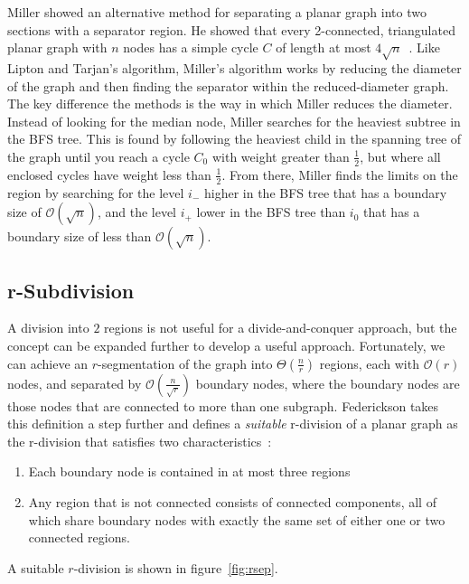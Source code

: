 \documentclass[11pt]{article}
\begin{document}
Miller showed an alternative method for separating a planar graph into two sections with a separator region. He showed that every 2-connected, triangulated planar graph with $n$ nodes has a simple cycle $C$ of length at most $4\sqrt{n}$~\cite{miller1984finding}. Like Lipton and Tarjan's algorithm, Miller's algorithm works by reducing the diameter of the graph and then finding the separator within the reduced-diameter graph. The key difference the methods is the way in which Miller reduces the diameter. Instead of looking for the median node, Miller searches for the heaviest subtree in the BFS tree. This is found by following the heaviest child in the spanning tree of the graph until you reach a cycle $C_0$ with weight greater than $\frac{1}{2}$, but where all enclosed cycles have weight less than $\frac{1}{2}$. From there, Miller finds the limits on the region by searching for the level $i_-$ higher in the BFS tree that has a boundary size of $\mathcal{O}(\sqrt{n})$, and the level $i_+$ lower in the BFS tree than $i_0$ that has  a boundary size of less than $\mathcal{O}(\sqrt{n})$.

\subsection{r-Subdivision}
\label{sec:graph-sep-rsub}

A division into $2$ regions is not useful for a divide-and-conquer approach, but the concept can be expanded further to develop a useful approach. Fortunately, we can achieve an $r$-segmentation of the graph into $\Theta \left (\frac{n}{r} \right )$ regions, each with $\mathcal{O}(r)$ nodes, and separated by $\mathcal{O} \left (\frac{n}{\sqrt{r}} \right )$ boundary nodes, where the boundary nodes are those nodes that are connected to more than one subgraph. Federickson takes this definition a step further and defines a \textit{suitable} r-division of a planar graph as the r-division that satisfies two characteristics~\cite{federickson1987fast}:
\begin{enumerate}
    \item Each boundary node is contained in at most three regions

    \item Any region that is not connected consists of connected components, all of which share boundary nodes with exactly the same set of either one or two connected regions.
\end{enumerate}
A suitable $r$-division is shown in figure~\ref{fig:rsep}.
\end{document}
